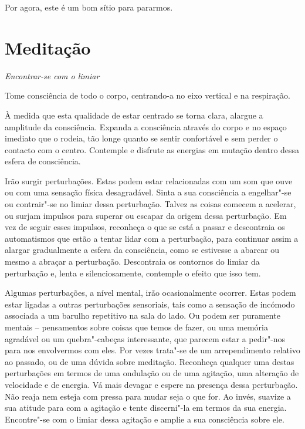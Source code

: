 Por agora, este é um bom sítio para pararmos.

\clearpage

\section[Meditação: encontrar-se com o limiar]{Meditação}

{\centering
\subSectionFont\selectfont
\textit{Encontrar-se com o limiar}
\par}

\bigskip

Tome consciência de todo o corpo, centrando-a no eixo vertical e na respiração.

À medida que esta qualidade de estar centrado se torna clara, alargue a
amplitude da consciência. Expanda a consciência através do corpo e no espaço
imediato que o rodeia, tão longe quanto se sentir confortável e sem perder o
contacto com o centro. Contemple e disfrute as energias em mutação dentro dessa
esfera de consciência.

Irão surgir perturbações. Estas podem estar relacionadas com um som que ouve ou
com uma sensação física desagradável. Sinta a sua consciência a engelhar"-se ou
contrair"-se no limiar dessa perturbação. Talvez as coisas comecem a acelerar,
ou surjam impulsos para superar ou escapar da origem dessa perturbação. Em vez
de seguir esses impulsos, reconheça o que se está a passar e descontraia os
automatismos que estão a tentar lidar com a perturbação, para continuar assim a
alargar gradualmente a esfera da consciência, como se estivesse a abarcar ou
mesmo a abraçar a perturbação. Descontraia os contornos do limiar da perturbação
e, lenta e silenciosamente, contemple o efeito que isso tem.

Algumas perturbações, a nível mental, irão ocasionalmente ocorrer. Estas podem
estar ligadas a outras perturbações sensoriais, tais como a sensação de incómodo
associada a um barulho repetitivo na sala do lado. Ou podem ser puramente
mentais -- pensamentos sobre coisas que temos de fazer, ou uma memória agradável
ou um quebra"-cabeças interessante, que parecem estar a pedir"-nos para nos
envolvermos com eles. Por vezes trata"-se de um arrependimento relativo ao
passado, ou de uma dúvida sobre meditação. Reconheça qualquer uma destas
perturbações em termos de uma ondulação ou de uma agitação, uma alteração de
velocidade e de energia. Vá mais devagar e espere na presença dessa perturbação.
Não reaja nem esteja com pressa para mudar seja o que for. Ao invés, suavize a
sua atitude para com a agitação e tente discerni"-la em termos da sua energia.
Encontre"-se com o limiar dessa agitação e amplie a sua consciência sobre ele.

